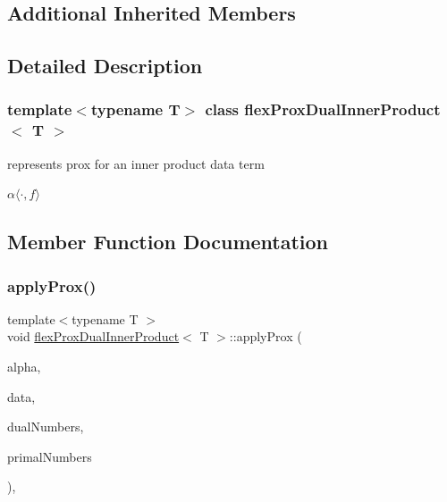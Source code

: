 \subsection*{Additional Inherited Members}


\subsection{Detailed Description}
\subsubsection*{template$<$typename T$>$\newline
class flex\+Prox\+Dual\+Inner\+Product$<$ T $>$}

represents prox for an inner product data term 

$ \alpha \langle \cdot,f\rangle $ 

\subsection{Member Function Documentation}
\mbox{\label{classflex_prox_dual_inner_product_ac12298c520f5e8e81724e330e8dae6a3}} 
\subsubsection{\texorpdfstring{apply\+Prox()}{applyProx()}\hspace{0.1cm}{\footnotesize\ttfamily [1/2]}}
{\footnotesize\ttfamily template$<$typename T $>$ \\
void \hyperlink{classflex_prox_dual_inner_product}{flex\+Prox\+Dual\+Inner\+Product}$<$ T $>$\+::apply\+Prox (\begin{DoxyParamCaption}\item[{T}]{alpha,  }\item[{\hyperlink{classflex_box_data}{flex\+Box\+Data}$<$ T $>$ $\ast$}]{data,  }\item[{const std\+::vector$<$ int $>$ \&}]{dual\+Numbers,  }\item[{const std\+::vector$<$ int $>$ \&}]{primal\+Numbers }\end{DoxyParamCaption})\hspace{0.3cm}{\ttfamily [inline]}, {\ttfamily [virtual]}}



